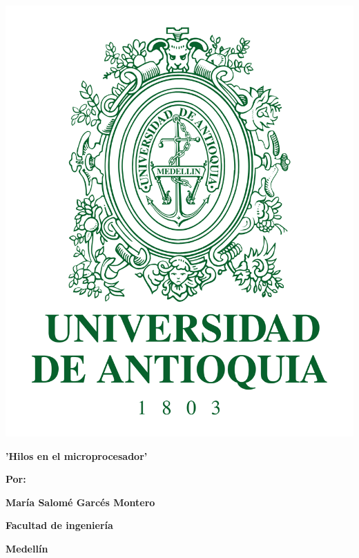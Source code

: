 \documentclass{article}
\begin{document}
\begin{center}
\includegraphics[scale=0.12]{escudo.png}
\end{center}
\vspace{50pt}
\begin{center}
\bf{\sc\Large 'Hilos en el microprocesador'}\\
\end{center}
\vspace{50pt}
\begin{center}
\begin{center}
\bf{\sc\Large Por:}\\
\end{center}
\bf{\sc\Large María Salomé Garcés Montero}\\
\end{center}
\vspace{60pt}
\begin{center}
\bf{\sc\Large Facultad de ingeniería}\\
\end{center}
\begin{center}
\bf{\sc\Large Medellín}
\end{center}
\end{document}
